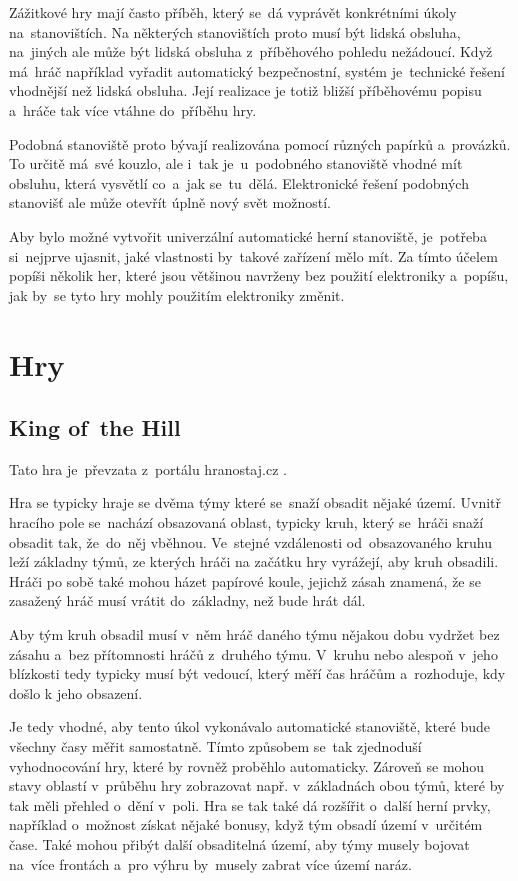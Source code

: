 Zážitkové hry mají často příběh, který se~dá vyprávět konkrétními úkoly na~stanovištích.
Na některých stanovištích proto musí být lidská obsluha, na~jiných ale může být lidská obsluha z~příběhového pohledu nežádoucí.
Když má~hráč například vyřadit automatický bezpečnostní, systém je~technické řešení vhodnější než lidská obsluha. %
Její realizace je totiž bližší příběhovému popisu a~hráče tak více vtáhne do~příběhu hry.

Podobná stanoviště proto bývají realizována pomocí různých papírků a~provázků.
To určitě má~své kouzlo, ale i~tak je~u~podobného stanoviště vhodné mít obsluhu, která vysvětlí co~a~jak se~tu~dělá.
Elektronické řešení podobných stanovišť ale může otevřít úplně nový svět možností.

Aby bylo možné vytvořit univerzální automatické herní stanoviště, je~potřeba si~nejprve ujasnit, jaké vlastnosti by~takové zařízení mělo mít.
Za tímto účelem popíši několik her, které jsou většinou navrženy bez použití elektroniky a~popíšu, jak by~se tyto hry mohly použitím elektroniky změnit.

\vspace{-3mm}
\section{Hry}
\vspace{-2mm}
\subsection{King of~the Hill \label{KOTH} }
Tato hra je~převzata z~portálu hranostaj.cz \cite{KingOfTheHill}.

Hra se typicky hraje se dvěma týmy které se~snaží obsadit nějaké území.
Uvnitř hracího pole se~nachází obsazovaná oblast, typicky kruh, který se~hráči snaží obsadit tak, že~do~něj vběhnou.
Ve~stejné vzdálenosti od~obsazovaného kruhu leží základny týmů, ze kterých hráči na začátku hry vyrážejí, aby kruh obsadili. 
Hráči po sobě také mohou házet papírové koule, jejichž zásah znamená, že se zasažený hráč musí vrátit do~základny, než bude hrát dál.

Aby tým kruh obsadil musí v~něm hráč daného týmu nějakou dobu vydržet bez zásahu a~bez přítomnosti hráčů z~druhého týmu.
V~kruhu nebo alespoň v~jeho blízkosti tedy typicky musí být vedoucí, který měří čas hráčům a~rozhoduje, kdy došlo k jeho obsazení.

Je tedy vhodné, aby tento úkol vykonávalo automatické stanoviště, které bude všechny časy měřit samostatně.
Tímto způsobem se~tak zjednoduší vyhodnocování hry, které by rovněž proběhlo automaticky.
Zároveň se mohou stavy oblastí v~průběhu hry zobrazovat např. v~základnách obou týmů, které by tak měli přehled o~dění v~poli.
Hra se tak také dá rozšířit o~další herní prvky, například o~možnost získat nějaké bonusy, když tým obsadí území v~určitém čase.
Také mohou přibýt další obsaditelná území, aby týmy musely bojovat na~více frontách a~pro výhru by~musely zabrat více území naráz.

